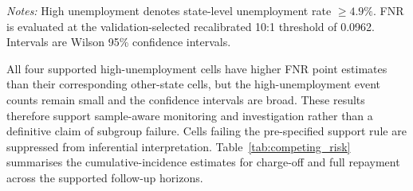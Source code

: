 \documentclass[10pt]{article}
\begin{document}
\begin{table}[!ht]
\centering
\caption{Sample-qualified grade-by-term diagnostics at the recalibrated 10:1 threshold. Cells are reported only when both unemployment groups contain at least 10 adverse outcomes and at least 10 non-events.}
\label{tab:supported_slices}

\vspace{3pt}
{\footnotesize \textit{Notes:} High unemployment denotes state-level unemployment rate $\geq4.9\%$. FNR is evaluated at the validation-selected recalibrated 10:1 threshold of 0.0962. Intervals are Wilson 95\% confidence intervals.}
\end{table}

All four supported high-unemployment cells have higher FNR point estimates than their corresponding other-state cells, but the high-unemployment event counts remain small and the confidence intervals are broad. These results therefore support sample-aware monitoring and investigation rather than a definitive claim of subgroup failure. Cells failing the pre-specified support rule are suppressed from inferential interpretation. Table~\ref{tab:competing_risk} summarises the cumulative-incidence estimates for charge-off and full repayment across the supported follow-up horizons.
\end{document}
